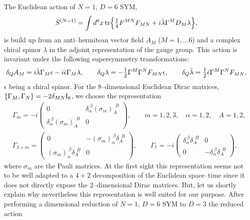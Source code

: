 \documentclass[a4paper,11pt]{article}
\begin{document}
The Euclidean action of $N = 1$, $D = 6$ SYM,
\begin{equation}
\label{2.2}
S^{(N = 1)} = \int d^6x\, {\rm tr} \Bigr\{
\hbox{\large$\frac{1}{4}$} F^{MN} F_{MN} +
i \bar{\lambda} \Gamma^M D_M \lambda \Bigr\},
\end{equation}
is build up from an anti--hermitean vector field $A_M$ ($M = 1, \ldots 6$) 
and a complex chiral spinor $\lambda$ in the adjoint representation of the 
gauge group. This action is invariant under the following supersymmetry
transformations:
\begin{gather}
\label{2.3}
\delta_Q A_M = i \bar{\lambda} \Gamma_M \epsilon - 
i \bar{\epsilon} \Gamma_M \lambda,
\qquad
\delta_Q \lambda = - \hbox{\large$\frac{1}{2}$} 
\Gamma^M \Gamma^N F_{MN} \epsilon,
\qquad
\delta_Q \bar{\lambda} = \hbox{\large$\frac{1}{2}$}
\bar{\epsilon} \Gamma^M \Gamma^N F_{MN},
\end{gather}
$\epsilon$ being a chiral spinor. For the $8$--dimensional Euclidean Dirac 
matrices, $\{ \Gamma_M, \Gamma_N \} = - 2 \delta_{MN} {\rm I}_8$, we choose 
the representation
\begin{align*}
&\Gamma_m = - i \begin{pmatrix} 0 & 
\delta_\alpha^{~\beta} (\sigma_m)_A^{\!~~B} \\
\delta_\alpha^{~\beta} (\sigma_m)_A^{\!~~B} & 0 \end{pmatrix},
\qquad
m = 1,2,3, \quad \alpha = 1,2, \quad A = 1,2,
\\
&\Gamma_{3 + m} = \begin{pmatrix} 0 & 
- (\sigma_m)_\alpha^{~\beta} \delta_A^{\!~~B} \\
(\sigma_m)_\alpha^{~\beta} \delta_A^{\!~~B} & 0 \end{pmatrix},
\qquad
\Gamma_7 = - i \begin{pmatrix} 
\delta_\alpha^{~\beta} \delta_A^{\!~~B} & 0 \\ 0 &  
- \delta_\alpha^{~\beta} \delta_A^{\!~~B} \end{pmatrix},
\end{align*}
where $\sigma_m$ are the Pauli matrices. At the first sight this 
representation seems not to be well adapted to a $4 + 2$ decomposition
of the Euclidean space--time since it does not directly expose the 
2--dimensional Dirac matrices. But, let us shortly explain why nevertheless
this representation is well suited for our purpose. After performing a
dimensional reduction of $N = 1$, $D = 6$ SYM to $D = 3$ the reduced action 
\end{document}
